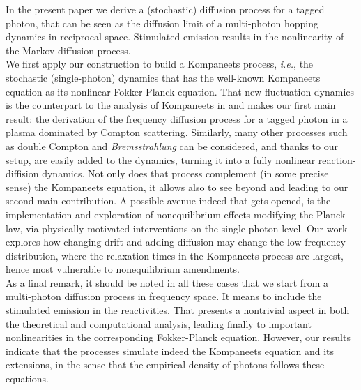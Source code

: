 \documentclass[a4paper,12pt,reqno,superscriptaddress,nofootinbib]{revtex4}
\theoremstyle{plain}
\theoremstyle{definition}
\theoremstyle{remark}
\newcommand{\0}{^{(0)}}
\newcommand{\1}{^{(1)}}
\newcommand{\2}{^{(2)}}
\begin{document}
In the present paper  we derive a (stochastic) diffusion process for a tagged photon, that can be seen as the diffusion limit of a multi-photon hopping dynamics in reciprocal space.  Stimulated emission results in the nonlinearity of the Markov diffusion process.\\ 
  We first apply our construction to build a Kompaneets process, {\it i.e.}, the stochastic (single-photon) dynamics that has the well-known Kompaneets equation as its nonlinear Fokker-Planck equation.
That new fluctuation dynamics  is the counterpart to the analysis of Kompaneets in \cite{kompa} and makes our first main result: the derivation of the frequency diffusion process for a tagged photon in a plasma dominated by Compton scattering.  Similarly, many other processes such as double Compton and  \textit{Bremsstrahlung} can be considered, and thanks to our setup, are easily added to the dynamics, turning it into a fully nonlinear reaction-diffision dynamics.  Not only does that process complement (in some precise sense) the Kompaneets equation, it allows also to see beyond and leading to our second main contribution.  A possible avenue indeed that gets opened, is the implementation and exploration of nonequilibrium effects modifying the Planck law, via physically motivated interventions on the single photon level. Our work explores how changing drift and adding diffusion may change the low-frequency distribution, where the relaxation times in the Kompaneets process are largest, hence most vulnerable to nonequilibrium amendments.\\
As a final remark, it should be noted in all these cases that we start from a multi-photon diffusion process in frequency space.  It means to include the stimulated emission in the reactivities. That presents a nontrivial aspect in both the theoretical and computational analysis, leading finally to important nonlinearities in the corresponding Fokker-Planck equation. However, our results indicate that the processes simulate indeed the Kompaneets equation and its extensions, in the sense that the empirical density of photons follows these equations.
\end{document}

